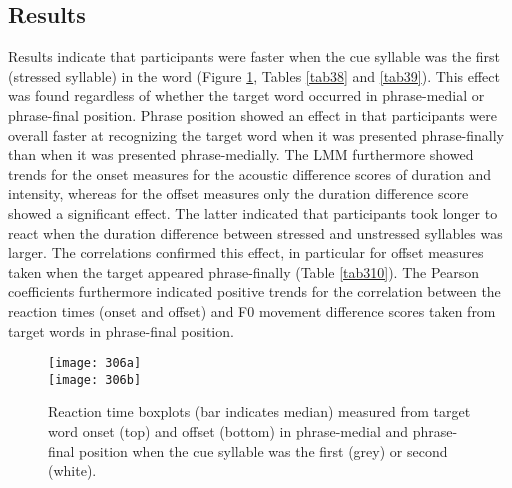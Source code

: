\subsection{Results}
Results indicate that participants were faster when the cue syllable was the first (stressed syllable) in the word (Figure \ref{fig306}, Tables \ref{tab38} and \ref{tab39}). This effect was found regardless of whether the target word occurred in phrase-medial or phrase-final position. Phrase position showed an effect in that participants were overall faster at recognizing the target word when it was presented phrase-finally than when it was presented phrase-medially. The LMM furthermore showed trends for the onset measures for the acoustic difference scores of duration and intensity, whereas for the offset measures only the duration difference score showed a significant effect. The latter indicated that participants took longer to react when the duration difference between stressed and unstressed syllables was larger. The correlations confirmed this effect, in particular for offset measures taken when the target appeared phrase-finally (Table \ref{tab310}). The Pearson coefficients furthermore indicated positive trends for the correlation between the reaction times (onset and offset) and F0 movement difference scores taken from target words in phrase-final position.

\begin{figure}
\texttt{[image: 306a]}\\ \vspace{0.5cm}
\texttt{[image: 306b]}
\caption{Reaction time boxplots (bar indicates median) measured from target word onset (top) and offset (bottom) in phrase-medial and phrase-final position when the cue syllable was the first (grey) or second (white).}\label{fig306}
\end{figure}

\begin{table}
\caption{Mean (SD) reaction times in Experiment III measured from target word onset and offset, split by phrase position (medial/final) and cue syllable (1/2).}
\label{tab38}
\end{table}

